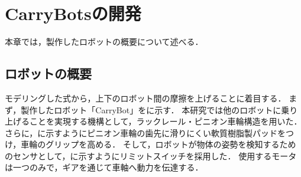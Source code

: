 \section{CarryBotsの開発}
本章では，製作したロボットの概要について述べる．

\subsection{ロボットの概要}
モデリングした式から，上下のロボット間の摩擦を上げることに着目する．
まず，製作したロボット「CarryBot」をに示す．
本研究では他のロボットに乗り上げることを実現する機構として，ラックレール・ピニオン車輪構造を用いた．
さらに，に示すようにピニオン車輪の歯先に滑りにくい軟質樹脂製パッドをつけ，車輪のグリップを高める．
そして，ロボットが物体の姿勢を検知するためのセンサとして，に示すようにリミットスイッチを採用した．
使用するモータは一つのみで，ギアを通じて車軸へ動力を伝達する．

